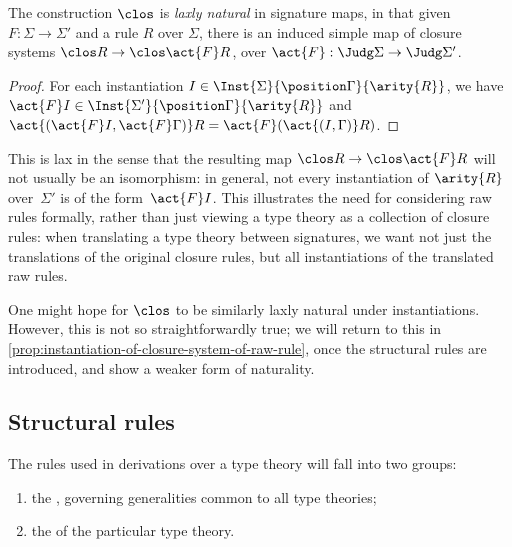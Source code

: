 \begin{proposition} \label{prop:closure-system-of-raw-rule-under-signature-map}
  The construction $\clos$ is \emph{laxly natural} in signature maps,
  in that given $F : \Sigma \to \Sigma'$ and a rule $R$ over $\Sigma$, there is an induced simple map of closure systems $\clos R \to \clos \act{F}R$, over $\act{F} : \Judg \Sigma \to \Judg \Sigma'$.
\end{proposition}

\begin{proof}
  For each instantiation $I \in \Inst{\Sigma}{\position \Gamma}{\arity{R}}$, we have $\act{F}I \in \Inst{\Sigma'}{\position \Gamma}{\arity{R}}$ and $\act{(\act{F} I, \act{F} \Gamma)} R = \act{F} (\act{(I, \Gamma)} R)$.
\end{proof}

This is lax in the sense that the resulting map $\clos R \to \clos \act{F} R$ will not usually be an isomorphism: in general, not every instantiation of $\arity{R}$ over~$\Sigma'$ is of the form~$\act{F} I$.
%
This illustrates the need for considering raw rules formally, rather than just viewing a type theory as a collection of closure rules: when translating a type theory between signatures, we want not just the translations of the original closure rules, but all instantiations of the translated raw rules.

One might hope for $\clos$ to be similarly laxly natural under instantiations.
%
However, this is not so straightforwardly true; we will return to this in \cref{prop:instantiation-of-closure-system-of-raw-rule}, once the structural rules are introduced, and show a weaker form of naturality.

\subsection{Structural rules}

The rules used in derivations over a type theory will fall into two groups:
%
\begin{enumerate}
\item the , governing generalities common to all type theories;
\item the  of the particular type theory.
\end{enumerate}

